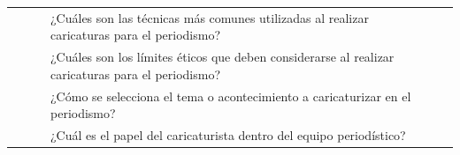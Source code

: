 \documentclass[12pt,a4paper]{article}
\begin{document}
\begin{landscape}
\begin{table}[ht!]
\begin{tabular}{clllcc}
			                                                       &                           & \multirow{2}{*}{\gbbbbbbbbbbbbbbb}  & ¿Cuáles son las técnicas más comunes utilizadas al realizar caricaturas para el periodismo?            &                                                                                                                                                        \\\cline{4-4}
			                                                       &                           &                                     & ¿Cuáles son los límites éticos que deben considerarse al realizar caricaturas para el periodismo?      &                                                                                                                                                        \\\cline{3-4}
			                                                       &                           & \multirow{2}{*}{\gbbbbbbbbbbbbbbbb} & ¿Cómo se selecciona el tema o acontecimiento a caricaturizar en el periodismo?                         &                                                                                                                                                        \\\cline{4-4}
			                                                       &                           &                                     & ¿Cuál es el papel del caricaturista dentro del equipo periodístico?                                    &                                                                                                                                                        \\\hline
		\end{tabular}
	\end{table}
\end{landscape}
\end{document}
